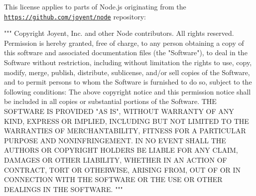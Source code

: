 \begin{DoxyItemize}
This license applies to parts of Node.\+js originating from the \href{https://github.com/joyent/node}{\texttt{https\+://github.\+com/joyent/node}} repository\+:

"{}"{}"{}   Copyright Joyent, Inc. and other Node contributors. All rights reserved.   Permission is hereby granted, free of charge, to any person obtaining a copy   of this software and associated documentation files (the "{}Software"{}), to   deal in the Software without restriction, including without limitation the   rights to use, copy, modify, merge, publish, distribute, sublicense, and/or   sell copies of the Software, and to permit persons to whom the Software is   furnished to do so, subject to the following conditions\+:    The above copyright notice and this permission notice shall be included in   all copies or substantial portions of the Software.    THE SOFTWARE IS PROVIDED "{}AS IS"{}, WITHOUT WARRANTY OF ANY KIND, EXPRESS OR   IMPLIED, INCLUDING BUT NOT LIMITED TO THE WARRANTIES OF MERCHANTABILITY,   FITNESS FOR A PARTICULAR PURPOSE AND NONINFRINGEMENT. IN NO EVENT SHALL THE   AUTHORS OR COPYRIGHT HOLDERS BE LIABLE FOR ANY CLAIM, DAMAGES OR OTHER   LIABILITY, WHETHER IN AN ACTION OF CONTRACT, TORT OR OTHERWISE, ARISING   FROM, OUT OF OR IN CONNECTION WITH THE SOFTWARE OR THE USE OR OTHER DEALINGS   IN THE SOFTWARE.   "{}"{}"{} 
\end{DoxyItemize}